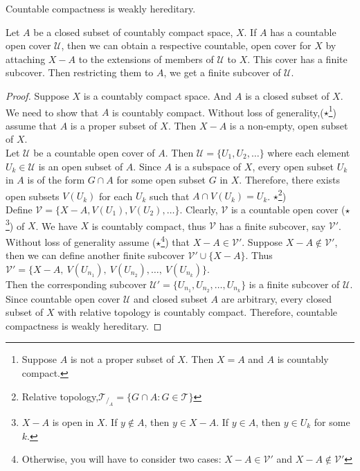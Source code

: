 \begin{theorem}
	Countable compactness is weakly hereditary.
	\cite[11.1.3]{joshi}
\end{theorem}
\begin{synopsis}
	Let $A$ be a closed subset of countably compact space, $X$.
	If $A$ has a countable open cover $\mathcal{U}$, then we can obtain a respective countable, open cover for $X$ by attaching $X-A$ to the extensions of members of $\mathcal{U}$ to $X$.
	This cover has a finite subcover.
	Then restricting them to $A$, we get a finite subcover of $\mathcal{U}$.
\end{synopsis}
\begin{proof}
	Suppose $X$ is a countably compact space.
	And $A$ is a closed subset of $X$.
	We need to show that $A$ is countably compact.
	Without loss of generality,($\star$\footnote{Suppose $A$ is not a proper subset of $X$.
	Then $X = A$ and $A$ is countably compact.}) assume that $A$ is a proper subset of $X$.
	Then $X-A$ is a non-empty, open subset of $X$.\\ 

	Let $\mathcal{U}$ be a countable open cover of $A$.
	Then $\mathcal{U} = \{ U_1, U_2, \dotsc \}$ where each element $U_k \in \mathcal{U}$ is an open subset of $A$.
	Since $A$ is a subspace of $X$, every open subset $U_k$ in $A$ is of the form $G \cap A$ for some open subset $G$ in $X$.
	Therefore, there exists open subsets $V(U_k)$ for each $U_k$ such that $A \cap V(U_k) = U_k$.
	$\star$\footnote{Relative topology,$\mathcal{T}_{/_A} = \{ G \cap A : G \in \mathcal{T} \}$})\\

	Define $\mathcal{V} = \{ X-A, V(U_1), V(U_2), \dots \}$.
	Clearly, $\mathcal{V}$ is a countable open cover ($\star$\footnote{$X-A$ is open in $X$.
	If $y \not\in A$, then $y \in X-A$.
	If $y \in A$, then $y \in U_k$ for some $k$.}) of $X$.
	We have $X$ is countably compact, thus $\mathcal{V}$ has a finite subcover, say $\mathcal{V}'$.
	Without loss of generality assume ($\star$\footnote{Otherwise, you will have to consider two cases: $X-A \in \mathcal{V}'$ and $X-A \not\in \mathcal{V}'$}) that $X-A \in \mathcal{V}'$.
	Suppose $X-A \not\in \mathcal{V}'$, then we can define another finite subcover $\mathcal{V}' \cup \{X-A\}$.
	Thus $\mathcal{V}' = \{ X-A,\ V(U_{n_1}),\ V(U_{n_2}),\dots,\ V(U_{n_k})\}$.\\

	Then the corresponding subcover $\mathcal{U}'=\{U_{n_1},U_{n_2},\dots,U_{n_k}\}$ is a finite subcover of $\mathcal{U}$.
	Since countable open cover $\mathcal{U}$ and closed subset $A$ are arbitrary, every closed subset of $X$ with relative topology is countably compact.
	Therefore, countable compactness is weakly hereditary.
\end{proof}

